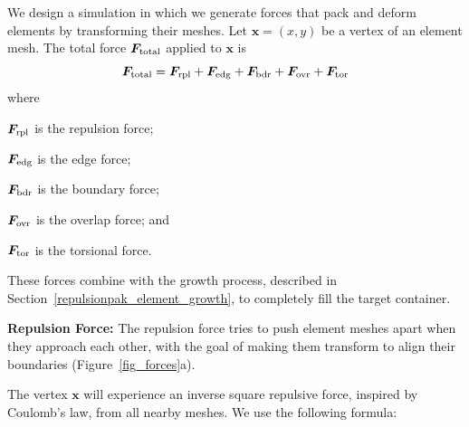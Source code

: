 \newtext
{
We design a simulation in which we generate 
forces that pack and deform elements by transforming their meshes.
Let $\bm{x} = (x, y)$ be a vertex of an element mesh. 
The total force $\bm{F}_\mathrm{total}$ applied to $\bm{x}$ is
\begin{equation}
\bm{F}_\mathrm{total} = \bm{F}_\mathrm{rpl} + \bm{F}_\mathrm{edg} + \bm{F}_\mathrm{bdr} + \bm{F}_\mathrm{ovr} + \bm{F}_\mathrm{tor}
\end{equation}
where 
\begin{packeddescriptions}
	\item[$\bm{F}_\mathrm{rpl}$] is the repulsion force;
	\item[$\bm{F}_\mathrm{edg}$] is the edge force;
	\item[$\bm{F}_\mathrm{bdr}$] is the boundary force;
	\item[$\bm{F}_\mathrm{ovr}$] is the overlap force; and
	\item[$\bm{F}_\mathrm{tor}$] is the torsional force.	
\end{packeddescriptions}
These forces combine with the growth process, described in
Section~\ref{repulsionpak_element_growth}, to completely fill the target container.
}



\medskip
\textbf{Repulsion Force:} 
The repulsion force tries to push element meshes apart when they approach
each other, with the goal of
making them transform to align their boundaries (Figure~\ref{fig_forces}a).
 
The vertex $\bm{x}$ will
experience an inverse square repulsive force, inspired by Coulomb's law,
from all nearby meshes.  We use the following formula:

